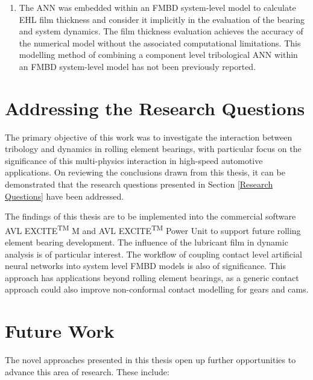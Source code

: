 \begin{enumerate}
	\item The ANN was embedded within an FMBD system-level model to calculate EHL film thickness and consider it implicitly in the evaluation of the bearing and system dynamics. The film thickness evaluation achieves the accuracy of the numerical model without the associated computational limitations. This modelling method of combining a component level tribological ANN within an FMBD system-level model has not been previously reported.
\end{enumerate}

\section{Addressing the Research Questions}
The primary objective of this work was to investigate the interaction between tribology and dynamics in rolling element bearings, with particular focus on the significance of this multi-physics interaction in high-speed automotive applications. On reviewing the conclusions drawn from this thesis, it can be demonstrated that the research questions presented in Section \ref{Research Questions} have been addressed.

The findings of this thesis are to be implemented into the commercial software AVL EXCITE\textsuperscript{TM} M and AVL EXCITE\textsuperscript{TM} Power Unit to support future rolling element bearing development. The influence of the lubricant film in dynamic analysis is of particular interest. The workflow of coupling contact level artificial neural networks into system level FMBD models is also of significance. This approach has applications beyond rolling element bearings, as a generic contact approach could also improve non-conformal contact modelling for gears and cams.

\section{Future Work}

The novel approaches presented in this thesis open up further opportunities to advance this area of research. These include:

